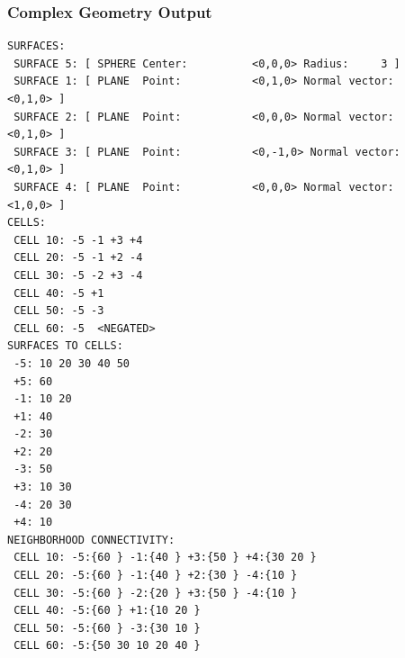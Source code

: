 \documentclass{beamer}
\begin{document}
\begin{frame}[fragile]
\frametitle{Complex Geometry Output}
%

\begin{Verbatim}
SURFACES: 
 SURFACE 5: [ SPHERE Center:          <0,0,0> Radius:     3 ]
 SURFACE 1: [ PLANE  Point:           <0,1,0> Normal vector:          <0,1,0> ]
 SURFACE 2: [ PLANE  Point:           <0,0,0> Normal vector:          <0,1,0> ]
 SURFACE 3: [ PLANE  Point:           <0,-1,0> Normal vector:          <0,1,0> ]
 SURFACE 4: [ PLANE  Point:           <0,0,0> Normal vector:          <1,0,0> ]
CELLS: 
 CELL 10: -5 -1 +3 +4 
 CELL 20: -5 -1 +2 -4 
 CELL 30: -5 -2 +3 -4 
 CELL 40: -5 +1 
 CELL 50: -5 -3 
 CELL 60: -5  <NEGATED>
SURFACES TO CELLS: 
 -5: 10 20 30 40 50 
 +5: 60 
 -1: 10 20 
 +1: 40 
 -2: 30 
 +2: 20 
 -3: 50 
 +3: 10 30 
 -4: 20 30 
 +4: 10 
NEIGHBORHOOD CONNECTIVITY: 
 CELL 10: -5:{60 } -1:{40 } +3:{50 } +4:{30 20 } 
 CELL 20: -5:{60 } -1:{40 } +2:{30 } -4:{10 } 
 CELL 30: -5:{60 } -2:{20 } +3:{50 } -4:{10 } 
 CELL 40: -5:{60 } +1:{10 20 } 
 CELL 50: -5:{60 } -3:{30 10 } 
 CELL 60: -5:{50 30 10 20 40 } 
\end{Verbatim}
\end{frame}  

\end{document}
